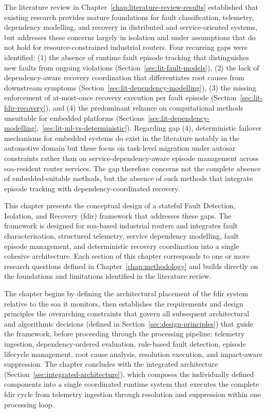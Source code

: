 The literature review in Chapter~\ref{chap:literature-review-results} established that existing research provides mature foundations for fault classification, telemetry, dependency modelling, and recovery in distributed and service-oriented systems, but addresses these concerns largely in isolation and under assumptions that do not hold for resource-constrained industrial routers. Four recurring gaps were identified: (1) the absence of runtime fault episode tracking that distinguishes new faults from ongoing violations (Section~\ref{sec:lit-fault-models}), (2) the lack of dependency-aware recovery coordination that differentiates root causes from downstream symptoms (Section~\ref{sec:lit-dependency-modelling}), (3) the missing enforcement of at-most-once recovery execution per fault episode (Section~\ref{sec:lit-fdir-recovery}), and (4) the predominant reliance on computational methods unsuitable for embedded platforms (Sections~\ref{sec:lit-dependency-modelling},~\ref{sec:lit-ml-vs-deterministic}). Regarding gap (4), deterministic failover mechanisms for embedded systems do exist in the literature notably in the automotive domain \cite{ref23,ref24,ref25} but these focus on task-level migration under \gls{autosar} constraints rather than on service-dependency-aware episode management across \gls{soa}-resident router services. The gap therefore concerns not the complete absence of embedded-suitable methods, but the absence of such methods that integrate episode tracking with dependency-coordinated recovery.

This chapter presents the conceptual design of a stateful Fault Detection, Isolation, and Recovery (\gls{fdir}) framework that addresses these gaps. The framework is designed for \gls{soa}-based industrial routers and integrates fault characterisation, structured telemetry, service dependency modelling, fault episode management, and deterministic recovery coordination into a single cohesive architecture. Each section of this chapter corresponds to one or more research questions defined in Chapter~\ref{chap:methodology} and builds directly on the foundations and limitations identified in the literature review.

The chapter begins by defining the architectural placement of the \gls{fdir} system relative to the \gls{soa} it monitors, then establishes the requirements and design principles the overarching constraints that govern all subsequent architectural and algorithmic decisions (defined in Section~\ref{sec:design-principles}) that guide the framework, before proceeding through the processing pipeline: telemetry ingestion, dependency-ordered evaluation, rule-based fault detection, episode lifecycle management, root cause analysis, resolution execution, and impact-aware suppression. The chapter concludes with the integrated architecture (Section~\ref{sec:integrated-architecture}), which composes the individually defined components into a single coordinated runtime system that executes the complete \gls{fdir} cycle from telemetry ingestion through resolution and suppression within one processing loop.

